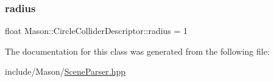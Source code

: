 \subsubsection{\texorpdfstring{radius}{radius}}
{\footnotesize\ttfamily float Mason\+::\+Circle\+Collider\+Descriptor\+::radius = 1}



The documentation for this class was generated from the following file\+:\begin{DoxyCompactItemize}
\item 
include/\+Mason/\hyperlink{_scene_parser_8hpp}{Scene\+Parser.\+hpp}\end{DoxyCompactItemize}

